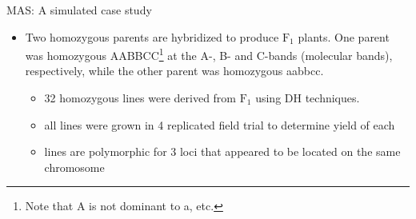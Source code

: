 \documentclass[
  ignorenonframetext,
  aspectratio=169]{beamer}
\providecommand{\tightlist}{%
  \setlength{\itemsep}{0pt}\setlength{\parskip}{0pt}}
\begin{document}
\begin{frame}{MAS: A simulated case study}
\protect\hypertarget{mas-a-simulated-case-study}{}
\footnotesize

\begin{itemize}
\tightlist
\item
  Two homozygous parents are hybridized to produce \(\mathrm{F_1}\)
  plants. One parent was homozygous
  AABBCC\footnote[frame]{Note that A is not dominant to a, etc.} at the
  A-, B- and C-bands (molecular bands), respectively, while the other
  parent was homozygous aabbcc.

  \begin{itemize}
  \footnotesize
  \item 32 homozygous lines were derived from $\mathrm{F_1}$ using DH techniques.
  \item all lines were grown in 4 replicated field trial to determine yield of each
  \item lines are polymorphic for 3 loci that appeared to be located on the same chromosome
  \end{itemize}
\end{itemize}
\end{frame}
\end{document}
